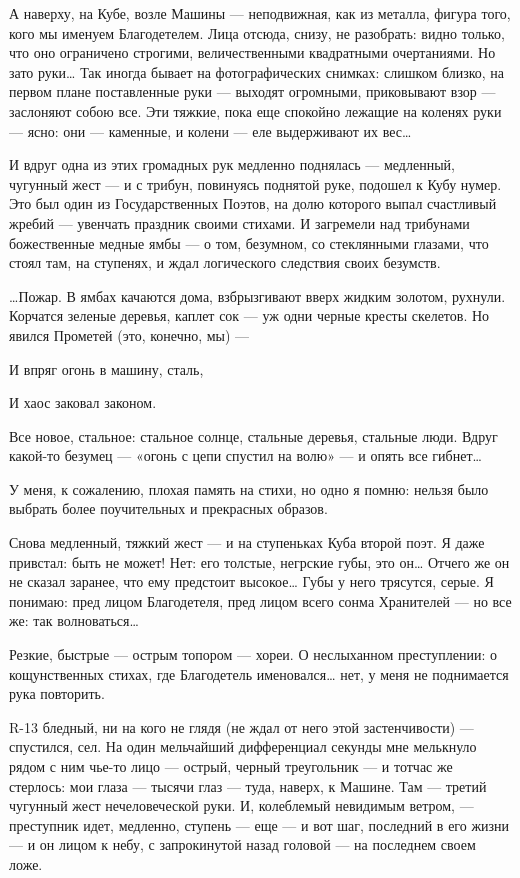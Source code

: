 \documentclass[11pt,openany]{book}
\begin{document}
А наверху, на Кубе, возле Машины --- неподвижная, как из металла, фигура того, кого мы именуем Благодетелем. Лица отсюда, снизу, не разобрать: видно только, что оно ограничено строгими, величественными квадратными очертаниями. Но зато руки\ldots{} Так иногда бывает на фотографических снимках: слишком близко, на первом плане поставленные руки --- выходят огромными, приковывают взор --- заслоняют собою все. Эти тяжкие, пока еще спокойно лежащие на коленях руки --- ясно: они --- каменные, и колени --- еле выдерживают их вес\ldots{}

И вдруг одна из этих громадных рук медленно поднялась --- медленный, чугунный жест --- и с трибун, повинуясь поднятой руке, подошел к Кубу нумер. Это был один из Государственных Поэтов, на долю которого выпал счастливый жребий --- увенчать праздник своими стихами. И загремели над трибунами божественные медные ямбы --- о том, безумном, со стеклянными глазами, что стоял там, на ступенях, и ждал логического следствия своих безумств.

\ldots{}Пожар. В ямбах качаются дома, взбрызгивают вверх жидким золотом, рухнули. Корчатся зеленые деревья, каплет сок --- уж одни черные кресты скелетов. Но явился Прометей (это, конечно, мы) ---

И впряг огонь в машину, сталь,

И хаос заковал законом.

Все новое, стальное: стальное солнце, стальные деревья, стальные люди. Вдруг какой-то безумец --- «огонь с цепи спустил на волю» --- и опять все гибнет\ldots{}

У меня, к сожалению, плохая память на стихи, но одно я помню: нельзя было выбрать более поучительных и прекрасных образов.

Снова медленный, тяжкий жест --- и на ступеньках Куба второй поэт. Я даже привстал: быть не может! Нет: его толстые, негрские губы, это он\ldots{} Отчего же он не сказал заранее, что ему предстоит высокое\ldots{} Губы у него трясутся, серые. Я понимаю: пред лицом Благодетеля, пред лицом всего сонма Хранителей --- но все же: так волноваться\ldots{}

Резкие, быстрые --- острым топором --- хореи. О неслыханном преступлении: о кощунственных стихах, где Благодетель именовался\ldots{} нет, у меня не поднимается рука повторить.

R-13 бледный, ни на кого не глядя (не ждал от него этой застенчивости) --- спустился, сел. На один мельчайший дифференциал секунды мне мелькнуло рядом с ним чье-то лицо --- острый, черный треугольник --- и тотчас же стерлось: мои глаза --- тысячи глаз --- туда, наверх, к Машине. Там --- третий чугунный жест нечеловеческой руки. И, колеблемый невидимым ветром, --- преступник идет, медленно, ступень --- еще --- и вот шаг, последний в его жизни --- и он лицом к небу, с запрокинутой назад головой --- на последнем своем ложе.
\end{document}
